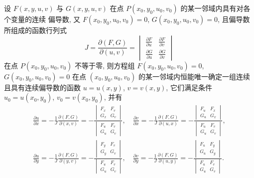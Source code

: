 \documentclass[a4paper,10pt,fleqn]{article}
\newcommand{\pdif}[2]{\frac{\partial #1}{\partial #2}}
\begin{document}
\begin{thm_impl}
    设 $F(x,y,u,v)$ 与 $G(x,y,u,v)$ 在点 $P(x_0,y_0,u_0,v_0)$ 的某一邻域内具有对各个变量的连续
    偏导数, 又 $F(x_0,y_0,u_0,v_0)=0$, $G(x_0,y_0,u_0,v_0)=0$, 且偏导数所组成的函数行列式
    \[
        J=\pdif{(F,G)}{(u,v)}=\begin{vmatrix}
            \pdif{F}{u} & \pdif{F}{v} \\
            \pdif{G}{u} & \pdif{G}{v}
        \end{vmatrix}
    \]
    在点 $P(x_0,y_0,u_0,v_0)$ 不等于零, 则方程组 $F(x_0,y_0,u_0,v_0)=0$, $G(x_0,y_0,u_0,v_0)=0$
    在点 $(x_0,y_0,u_0,v_0)$ 的某一邻域内恒能唯一确定一组连续且具有连续偏导数的函数 $u=u(x,y)$,
    $v=v(x,y)$, 它们满足条件 $u_0=u(x_0,y_0)$, $v_0=v(x_0,y_0)$, 并有
    \begin{align*}
        \pdif{u}{x}=-\frac{1}{J}\pdif{(F,G)}{(x,v)}=-\frac{\begin{vmatrix}F_x&F_v\\G_x&G_v\end{vmatrix}}{\begin{vmatrix}F_u&F_v\\G_u&G_v\end{vmatrix}},\quad
        \pdif{v}{x}=-\frac{1}{J}\pdif{(F,G)}{(u,x)}=-\frac{\begin{vmatrix}F_u&F_x\\G_u&G_x\end{vmatrix}}{\begin{vmatrix}F_u&F_v\\G_u&G_v\end{vmatrix}}, \\
        \pdif{u}{y}=-\frac{1}{J}\pdif{(F,G)}{(y,v)}=-\frac{\begin{vmatrix}F_y&F_v\\G_y&G_v\end{vmatrix}}{\begin{vmatrix}F_u&F_v\\G_u&G_v\end{vmatrix}},\quad
        \pdif{v}{y}=-\frac{1}{J}\pdif{(F,G)}{(u,y)}=-\frac{\begin{vmatrix}F_u&F_y\\G_u&G_y\end{vmatrix}}{\begin{vmatrix}F_u&F_v\\G_u&G_v\end{vmatrix}}.
    \end{align*}
\end{thm_impl}
\end{document}
